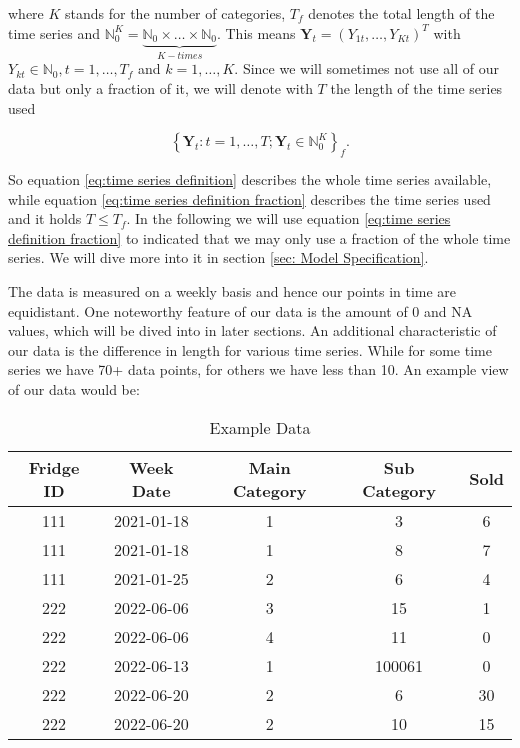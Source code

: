 where $K$ stands for the number of categories, $T_f$ denotes the total length of the time series and $\mathbb{N}_0^K = \underbrace{\mathbb{N}_0 \times \ldots \times \mathbb{N}_0}_{K-times}$. This means $\bm{Y}_t = (Y_{1t},\ldots,Y_{Kt})^T$ with $Y_{kt} \in \mathbb{N}_0, t=1,\ldots,T_f$ and $k=1,\ldots,K$. Since we will sometimes not use all of our data but only a fraction of it, we will denote with $T$ the length of the time series used

\begin{equation}
\left\{\bm{Y}_t:t=1,\ldots,T; \bm{Y}_t \in \mathbb{N}_0^K \right\}_f.
\label{eq:time series definition fraction}
\end{equation}

So equation \ref{eq:time series definition} describes the whole time series available, while equation \ref{eq:time series definition fraction} describes the time series used and it holds $T\leq T_f$. In the following we will use equation \ref{eq:time series definition fraction} to indicated that we may only use a fraction of the whole time series. We will dive more into it in section \ref{sec: Model Specification}.

The data is measured on a weekly basis and hence our points in time are equidistant. One noteworthy feature of our data is the amount of 0 and NA values, which will be dived into in later sections. An additional characteristic of our data is the difference in length for various time series. While for some time series we have 70+ data points, for others we have less than 10. An example view of our data would be: 

\begin{table}[h!]
\centering
\begin{tabular}{ccccc}
\hline
\rowcolor[HTML]{FFFFFF} 
\textbf{Fridge ID} & \textbf{Week Date} & \textbf{Main Category} & \textbf{Sub Category} & \textbf{Sold} \\ \hline
111                & 2021-01-18         & 1                      & 3                     & 6             \\
111                & 2021-01-18         & 1                      & 8                     & 7             \\
111                & 2021-01-25         & 2                      & 6                     & 4             \\
222                & 2022-06-06         & 3                      & 15                    & 1             \\
222                & 2022-06-06         & 4                      & 11                    & 0             \\
222                & 2022-06-13         & 1                      & 100061                & 0             \\
222                & 2022-06-20         & 2                      & 6                     & 30            \\
222                & 2022-06-20         & 2                      & 10                    & 15            \\ \hline
\end{tabular}
\caption{Example Data}
\label{tab:ExampleData}
\end{table}

